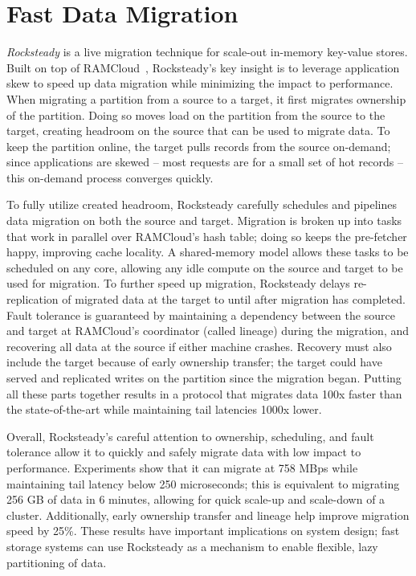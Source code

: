 \section{Fast Data Migration}

\emph{Rocksteady} is a live migration technique for scale-out
in-memory key-value stores.
%
Built on top of RAMCloud~\cite{ramcloud}, Rocksteady’s key insight is to
leverage application skew to speed up data migration while minimizing
the impact to performance.
%
When migrating a partition from a source to a target, it first migrates
ownership of the partition.
%
Doing so moves load on the partition from the source to the target, creating
headroom on the source that can be used to migrate data.
%
To keep the partition online, the target pulls records from the source
on-demand; since applications are skewed – most requests are for a small
set of hot records – this on-demand process converges quickly.

To fully utilize created headroom, Rocksteady carefully schedules and
pipelines data migration on both the source and target.
%
Migration is
broken up into tasks that work in parallel over RAMCloud’s hash table;
doing so keeps the pre-fetcher happy, improving cache locality.
%
A shared-memory model allows these tasks to be scheduled on any core,
allowing any idle compute on the source and target to be used for
migration.
%
To further speed up migration, Rocksteady delays
re-replication of migrated data at the target to until after migration
has completed.
%
Fault tolerance is guaranteed by maintaining a dependency
between the source and target at RAMCloud’s coordinator (called lineage)
during the migration, and recovering all data at the source if either
machine crashes.
%
Recovery must also include the target because of early
ownership transfer; the target could have served and replicated writes
on the partition since the migration began.
%
Putting all these parts
together results in a protocol that migrates data 100x faster than the
state-of-the-art while maintaining tail latencies 1000x lower.

Overall, Rocksteady’s careful attention to ownership, scheduling, and
fault tolerance allow it to quickly and safely migrate data with low
impact to performance.
%
Experiments show that it can migrate at 758 MBps
while maintaining tail latency below 250 microseconds; this is
equivalent to migrating 256 GB of data in 6 minutes, allowing for quick
scale-up and scale-down of a cluster.
%
Additionally, early ownership transfer and
lineage help improve migration speed by 25\%.
%
These results have
important implications on system design; fast storage systems can use
Rocksteady as a mechanism to enable flexible, lazy partitioning of
data.

